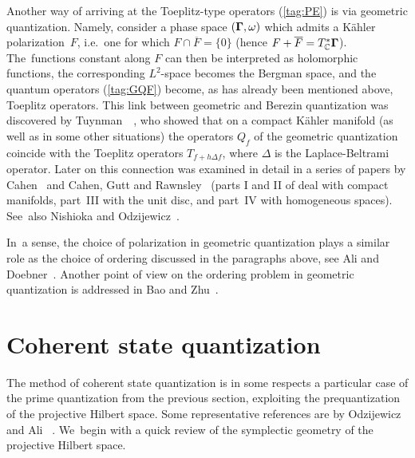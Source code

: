 \documentclass[11pt]{amsart}
\numberwithin{equation}{section}
\theoremstyle{remark}
\newcommand\Omg{{\bigam}}   %
\newcommand{\CC}{\C}
\newcommand{\bigam}{\mbox{\boldmath $\Gamma$}}
\newcommand{\C}{\mathbb C}
\begin{document}
Another way of arriving at the Toeplitz-type operators (\ref{tag:PE}) is via
geometric quantization. Namely, consider a phase space $(\Omg,\omega)$ which
admits a K\"ahler polarization~$F$, i.e.~one for which $F\cap\overline F=\{0\}$
(hence $F+\overline F=T^*_\CC \Omg$). The~functions constant along $F$ can then
be interpreted as holomorphic functions, the corresponding $L^2$-space becomes
the Bergman space, and the quantum operators (\ref{tag:GQF}) become, as has
already been mentioned above, Toeplitz operators. This link between geometric
and Berezin quantization was discovered by
Tuynman~\cite{bib:TuyGBK}~\cite{bib:TuyCm}, who showed that on a compact
K\"ahler manifold (as well as in some other situations) the operators $Q_f$ of
the geometric quantization coincide with the Toeplitz operators $T_{f+h\Delta
f}$, where $\Delta$ is the Laplace-Beltrami operator. Later on this connection
was examined in detail in a series of papers by Cahen~\cite{bib:Cahen} and
Cahen, Gutt and Rawnsley~\cite{bib:CGR} (parts I and II of \cite{bib:CGR} deal
with compact manifolds, part~III with the unit disc, and part~IV with
homogeneous spaces). See~also Nishioka \cite{bib:Nishi} and
Odzijewicz~\cite{bib:OdziB}.

In~a sense, the choice of polarization in geometric quantization plays a
similar role as the choice of ordering discussed in the paragraphs above, see
Ali and Doebner~\cite{bib:AliD}. Another point of view on the ordering problem
in geometric quantization is addressed in Bao and Zhu~\cite{bib:BaoZ}.


\section{Coherent state quantization}
\label{sec-cohstqua}
The method of coherent state quantization is in some respects a particular
case of the prime quantization from the previous section, exploiting the
prequantization of the projective Hilbert space. Some representative references
are by Odzijewicz~\cite{bib:OdzijA} \cite{bib:OdziB} \cite{bib:OdzijS}
\cite{bib:OdzijD} and Ali~\cite{bib:AliCS} \cite{bib:AAli} \cite{bib:AliM}.
We~begin with a quick review of the symplectic geometry of the projective
Hilbert space.
\end{document}
